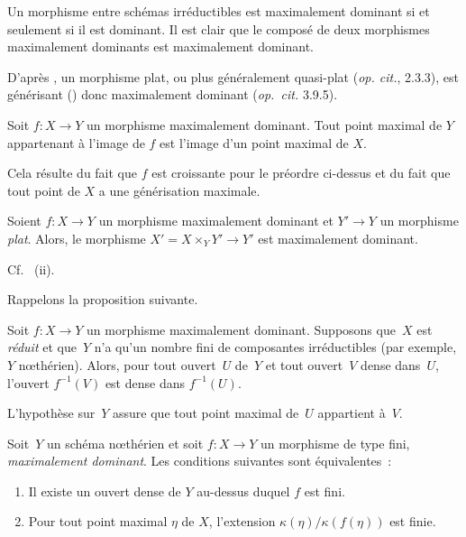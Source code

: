 \documentclass[10pt]{../fichiers-configuration-latex/smfart}
\begin{document}
Un morphisme entre schémas irréductibles est maximalement dominant si et seulement si il est
dominant. Il est clair que le composé de deux morphismes maximalement dominants est
maximalement dominant.

\begin{exemple2}
D'après , un morphisme plat, ou plus généralement quasi-plat (\emph{op. cit.},
2.3.3), est générisant () donc maximalement dominant (\emph{op. cit.} 3.9.5).
\end{exemple2}

\begin{proposition2}\label{2-image maximalement dominant}
Soit $f:X→Y$ un morphisme maximalement dominant. Tout point maximal de $Y$ appartenant à l'image de $f$
est l'image d'un point maximal de $X$.
\end{proposition2}

\begin{démo}
Cela résulte du fait que $f$ est croissante pour le préordre ci-dessus
et du fait que tout point de $X$ a une générisation maximale.
\end{démo}

\begin{proposition2}\label{2-cb maximalement dominant par plat}
Soient $f:X→Y$ un morphisme maximalement dominant et $Y'→Y$ un morphisme
\emph{plat}. Alors, le morphisme $X'=X×_Y Y'→Y'$ est maximalement dominant.
\end{proposition2}

\begin{démo}
Cf.  (ii).
\end{démo}

Rappelons la proposition suivante.

\begin{proposition2}[\ega{iv}{20.3.5}]
Soit $f:X→Y$ un morphisme maximalement dominant. Supposons que $X$
est \emph{réduit} et que $Y$ n'a qu'un nombre fini de composantes
irréductibles (par exemple, $Y$ nœthérien).
Alors, pour tout ouvert $U$ de $Y$ et tout ouvert $V$
dense dans $U$, l'ouvert $f^{-1}(V)$ est dense dans $f^{-1}(U)$.
\end{proposition2}

L'hypothèse sur $Y$ assure que tout point maximal de $U$ appartient à $V$.

\begin{proposition2}
\label{2-génériquement fini}
Soit $Y$ un schéma nœthérien et soit $f:X→Y$ un morphisme de type fini, \emph{maximalement
dominant}. Les conditions suivantes sont équivalentes :
\begin{enumerate}
\item Il existe un ouvert dense de $Y$ au-dessus duquel $f$ est fini.
\item Pour tout point maximal $η$ de $X$, l'extension $κ(η)/κ(f(η))$
est finie.
\end{enumerate}
\end{proposition2}
\end{document}
